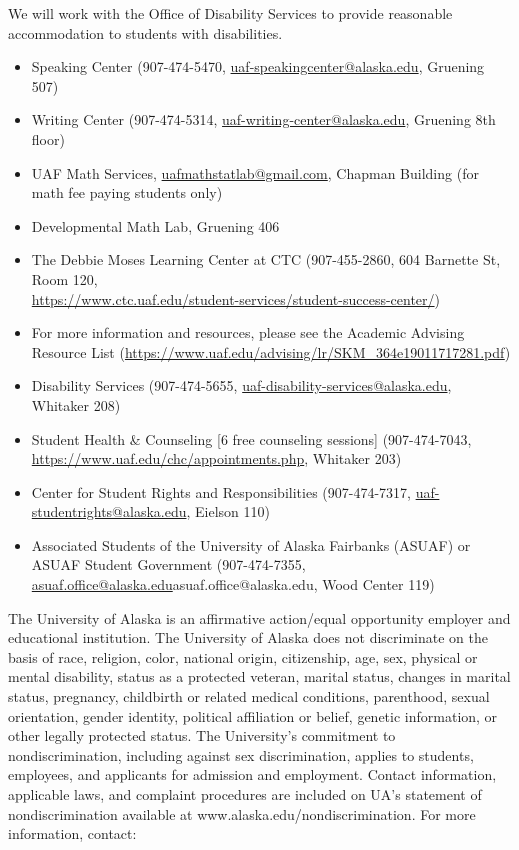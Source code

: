\documentclass[12pt]{article}
\def\mailto#1{\href{mailto:#1}{#1}}
\begin{document}
 We will work with the Office of Disability Services to provide reasonable accommodation to students with disabilities.

\begin{itemize}
\setlength\itemsep{0em}
        \item Speaking Center (907-474-5470,
        \mailto{uaf-speakingcenter@alaska.edu}, Gruening 507)
\item Writing Center (907-474-5314, \mailto{uaf-writing-center@alaska.edu}, Gruening 8th floor)
\item UAF Math Services, \mailto{uafmathstatlab@gmail.com}, Chapman Building (for math fee paying students only)
\item Developmental Math Lab, Gruening 406
\item The Debbie Moses Learning Center at CTC (907-455-2860, 604 Barnette St, Room 120,\\ \mailto{https://www.ctc.uaf.edu/student-services/student-success-center/})
\item For more information and resources, please see the Academic Advising Resource List (\url{https://www.uaf.edu/advising/lr/SKM_364e19011717281.pdf})
\end{itemize}

\begin{itemize}
\setlength\itemsep{0em}
\item Disability Services (907-474-5655, \mailto{uaf-disability-services@alaska.edu}, Whitaker 208)
\item Student Health \& Counseling [6 free counseling sessions] (907-474-7043, \url{https://www.uaf.edu/chc/appointments.php}, Whitaker 203)
\item Center for Student Rights and Responsibilities (907-474-7317, \mailto{uaf-studentrights@alaska.edu}, Eielson 110)
\item Associated Students of the University of Alaska Fairbanks (ASUAF) or ASUAF Student Government (907-474-7355, \mailto{asuaf.office@alaska.edu}{asuaf.office@alaska.edu}, Wood Center 119)
\end{itemize}

The University of Alaska is an affirmative action/equal opportunity employer and educational institution. The University of Alaska does not discriminate on the basis of race, religion, color, national origin, citizenship, age, sex, physical or mental disability, status as a protected veteran, marital status, changes in marital status, pregnancy, childbirth or related medical conditions, parenthood, sexual orientation, gender identity, political affiliation or belief, genetic information, or other legally protected status. The University's commitment to nondiscrimination, including against sex discrimination, applies to students, employees, and applicants for admission and employment. Contact information, applicable laws, and complaint procedures are included on UA's statement of nondiscrimination available at www.alaska.edu/nondiscrimination. For more information, contact:
\end{document}
